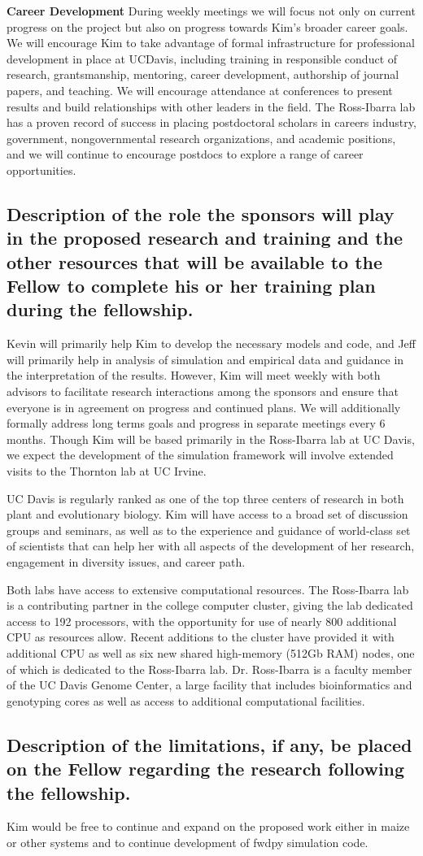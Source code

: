 \textbf{Career Development}
During weekly  meetings we will focus not only on current progress on the project but also on progress  towards Kim's broader career goals. We will encourage Kim to take advantage of formal infrastructure for professional development in place at UCDavis, including training in responsible conduct of research, grantsmanship, mentoring, career development, authorship of journal papers, and teaching. We will encourage attendance at conferences to present results and build relationships with other leaders in the field. The Ross-Ibarra lab has a proven record of success in placing postdoctoral scholars in careers industry, government, nongovernmental research organizations, and academic positions, and we will continue to encourage postdocs to explore a range of career opportunities.

\subsection{Description of the role the sponsors will play in the proposed research and training and the other resources that will be available to the Fellow to complete his or her training plan during the fellowship.}

Kevin will primarily help Kim to develop the necessary models and code, and Jeff will primarily help in analysis of simulation and empirical data and guidance in the interpretation of the results. 
However, Kim will meet weekly with both advisors to facilitate research interactions among the sponsors and ensure that everyone is in agreement on progress and continued plans.   We will additionally formally address long terms goals and progress in separate meetings every 6 months. Though Kim will be based primarily in the Ross-Ibarra lab at UC Davis, we expect the development of the simulation framework will involve extended visits to the Thornton lab at UC Irvine.

UC Davis is regularly ranked as one of the top three centers of research in both plant and evolutionary biology.  Kim will have access to a broad set of discussion groups and seminars, as well as to the experience and guidance of world-class set of scientists that can help her with all aspects of the development of her research, engagement in diversity issues, and career path.

Both labs have access to extensive computational resources. The Ross-Ibarra lab is a contributing partner in the college  computer cluster, giving the lab dedicated access to 192 processors, with the opportunity for use of nearly 800 additional CPU as resources allow. Recent additions to the cluster have provided it with additional CPU as well as six new shared high-memory (512Gb RAM) nodes, one of which is dedicated to the Ross-Ibarra lab. Dr. Ross-Ibarra is a faculty member of the UC Davis Genome Center, a large facility that includes bioinformatics and genotyping cores as well as access to additional computational facilities. 

\subsection{Description of the limitations, if any, be placed on the Fellow regarding the research following the fellowship.}
Kim would be free to continue and expand on the proposed work either in maize or other systems and to continue development of fwdpy simulation code.
%